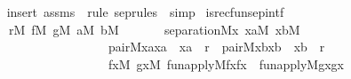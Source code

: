 \begin{isabellebody}
%
\isadelimproof
\ \ %
\endisadelimproof
%
\isatagproof
{}\isamarkupfalse%
\ {\isacharparenleft}{\kern0pt}insert\ assms\ {\isacharsemicolon}{\kern0pt}\ {\isacharparenleft}{\kern0pt}rule\ sep{\isacharunderscore}{\kern0pt}rules\ {\isacharbar}{\kern0pt}\ simp{\isacharparenright}{\kern0pt}{\isacharplus}{\kern0pt}{\isacharparenright}{\kern0pt}%
\endisatagproof
{\isafoldproof}%
%
\isadelimproof
\isanewline
%
\endisadelimproof
\isanewline
\isanewline
{}\isamarkupfalse%
\ is{\isacharunderscore}{\kern0pt}recfun{\isacharunderscore}{\kern0pt}sep{\isacharunderscore}{\kern0pt}intf\ {\isacharcolon}{\kern0pt}\isanewline
\ \ \isanewline
\ \ \ \ {\isachardoublequoteopen}r{\isasymin}M{\isachardoublequoteclose}\ {\isachardoublequoteopen}f{\isasymin}M{\isachardoublequoteclose}\ {\isachardoublequoteopen}g{\isasymin}M{\isachardoublequoteclose}\ {\isachardoublequoteopen}a{\isasymin}M{\isachardoublequoteclose}\ {\isachardoublequoteopen}b{\isasymin}M{\isachardoublequoteclose}\isanewline
\ \ \isanewline
\ \ \ \ {\isachardoublequoteopen}separation{\isacharparenleft}{\kern0pt}{\isacharhash}{\kern0pt}{\isacharhash}{\kern0pt}M{\isacharcomma}{\kern0pt}{\isasymlambda}x{\isachardot}{\kern0pt}\ {\isasymexists}xa{\isasymin}M{\isachardot}{\kern0pt}\ {\isasymexists}xb{\isasymin}M{\isachardot}{\kern0pt}\isanewline
\ \ \ \ \ \ \ \ \ \ \ \ \ \ \ \ \ \ \ \ pair{\isacharparenleft}{\kern0pt}{\isacharhash}{\kern0pt}{\isacharhash}{\kern0pt}M{\isacharcomma}{\kern0pt}x{\isacharcomma}{\kern0pt}a{\isacharcomma}{\kern0pt}xa{\isacharparenright}{\kern0pt}\ {\isacharampersand}{\kern0pt}\ xa\ {\isasymin}\ r\ {\isacharampersand}{\kern0pt}\ pair{\isacharparenleft}{\kern0pt}{\isacharhash}{\kern0pt}{\isacharhash}{\kern0pt}M{\isacharcomma}{\kern0pt}x{\isacharcomma}{\kern0pt}b{\isacharcomma}{\kern0pt}xb{\isacharparenright}{\kern0pt}\ {\isacharampersand}{\kern0pt}\ xb\ {\isasymin}\ r\ {\isacharampersand}{\kern0pt}\isanewline
\ \ \ \ \ \ \ \ \ \ \ \ \ \ \ \ \ \ \ \ {\isacharparenleft}{\kern0pt}{\isasymexists}fx{\isasymin}M{\isachardot}{\kern0pt}\ {\isasymexists}gx{\isasymin}M{\isachardot}{\kern0pt}\ fun{\isacharunderscore}{\kern0pt}apply{\isacharparenleft}{\kern0pt}{\isacharhash}{\kern0pt}{\isacharhash}{\kern0pt}M{\isacharcomma}{\kern0pt}f{\isacharcomma}{\kern0pt}x{\isacharcomma}{\kern0pt}fx{\isacharparenright}{\kern0pt}\ {\isacharampersand}{\kern0pt}\ fun{\isacharunderscore}{\kern0pt}apply{\isacharparenleft}{\kern0pt}{\isacharhash}{\kern0pt}{\isacharhash}{\kern0pt}M{\isacharcomma}{\kern0pt}g{\isacharcomma}{\kern0pt}x{\isacharcomma}{\kern0pt}gx{\isacharparenright}{\kern0pt}\ {\isacharampersand}{\kern0pt}\isanewline

\end{isabellebody}
